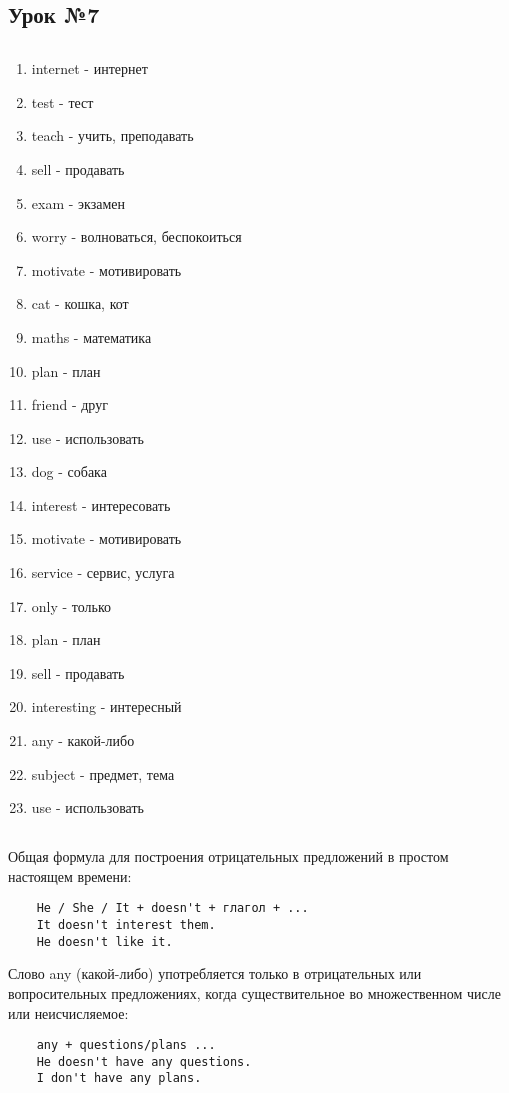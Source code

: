 \subsection{Урок №7}

\subsection*{}
\begin{multicols}{2}
    \begin{enumerate}\setlength{\itemsep}{0pt}
        \item internet - интернет
        \item test - тест
        \item teach - учить, преподавать
        \item sell - продавать
        \item exam - экзамен
        \item worry - волноваться, беспокоиться
        \item motivate - мотивировать
        \item cat - кошка, кот
        \item maths - математика
        \item plan - план
        \item friend - друг
        \item use - использовать
        \item dog - собака
        \item interest - интересовать
        \item motivate - мотивировать
        \item service - сервис, услуга
        \item only - только
        \item plan - план
        \item sell - продавать
        \item interesting - интересный
        \item any - какой-либо
        \item subject - предмет, тема
        \item use - использовать
    \end{enumerate}
\end{multicols}

\subsection*{}
Общая формула для построения отрицательных предложений в простом настоящем времени:
\begin{verbatim}
    He / She / It + doesn't + глагол + ...
    It doesn't interest them.
    He doesn't like it.
\end{verbatim}

Слово any (какой-либо) употребляется только в отрицательных или вопросительных предложениях, когда
существительное во множественном числе или неисчисляемое:
\begin{verbatim}
    any + questions/plans ...
    He doesn't have any questions.
    I don't have any plans.
\end{verbatim}